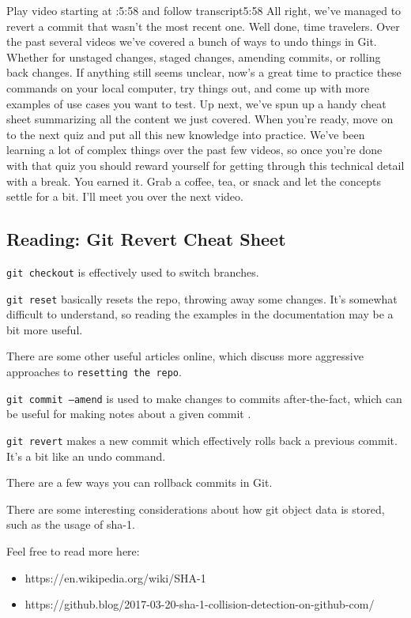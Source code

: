 	Play video starting at :5:58 and follow transcript5:58
	All right, we've managed to revert a commit that wasn't the most recent one. Well done, time travelers. Over the past several videos we've covered a bunch of ways to undo things in Git. Whether for unstaged changes, staged changes, amending commits, or rolling back changes. If anything still seems unclear, now's a great time to practice these commands on your local computer, try things out, and come up with more examples of use cases you want to test. Up next, we've spun up a handy cheat sheet summarizing all the content we just covered. When you're ready, move on to the next quiz and put all this new knowledge into practice. We've been learning a lot of complex things over the past few videos, so once you're done with that quiz you should reward yourself for getting through this technical detail with a break. You earned it. Grab a coffee, tea, or snack and let the concepts settle for a bit. I'll meet you over the next video.
	
	\subsection{Reading: Git Revert Cheat Sheet}
	
	
	\texttt{git checkout} is effectively used to switch branches.
	
	\texttt{git reset} basically resets the repo, throwing away some changes. It’s somewhat difficult to understand, so reading the examples in the documentation may be a bit more useful. 
	
	There are some other useful articles online, which discuss more aggressive approaches to \texttt{resetting the repo}.
	
	\texttt{git commit --amend} is used to make changes to commits after-the-fact, which can be useful for making notes about a given commit .
	
	\texttt{git revert} makes a new commit which effectively rolls back a previous commit. It’s a bit like an undo command.
	
	There are a few ways you can rollback commits in Git. 
	
	There are some interesting considerations about how git object data is stored, such as the usage of sha-1. 
	
	Feel free to read more here:
	
	\begin{itemize}
		\item 	https://en.wikipedia.org/wiki/SHA-1
		\item  	https://github.blog/2017-03-20-sha-1-collision-detection-on-github-com/
	\end{itemize}
	

